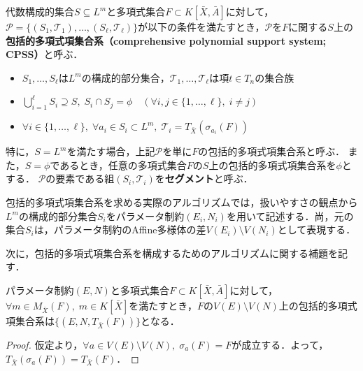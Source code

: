 \begin{definition}
	\label{chapter04:definition:CPSS}
	代数構成的集合$S \subseteq L^m$と多項式集合$F \subset K[\bar{X}, \bar{A}]$に対して，$\mathcal{P} = \{ (S_1, \mathscr{T}_1), \dots , (S_\ell, \mathscr{T}_\ell)  \}$が以下の条件を満たすとき，$\mathcal{P}$を$F$に関する$S$上の\textbf{包括的多項式項集合系（comprehensive polynomial support system; CPSS）}と呼ぶ．
	\begin{itemize}
		\item $S_1, \dots, S_\ell$は$L^m$の構成的部分集合，$\mathscr{T}_1, \dots, \mathscr{T}_\ell$は項$t \in T_n$の集合族
		\item $\displaystyle \bigcup_{i=1}^\ell S_i\supseteq S, \; S_i \cap S_j = \phi \quad (\forall i,j \in \{ 1, \dots, \ell \}, \; i \ne j)$
		\item $\forall i \in \{1, \dots, \ell \}, \; \forall a_i \in S_i \subset L^m, \; \mathscr{T}_i = T_{\bar{X}}(\sigma_{a_i}(F))$
	\end{itemize}
	特に，$S=L^m$を満たす場合，上記$\mathcal{P}$を単に$F$の包括的多項式項集合系と呼ぶ．
	また，$S=\phi$であるとき，任意の多項式集合$F$の$S$上の包括的多項式項集合系を$\phi$とする．
	$\mathcal{P}$の要素である組$(S_i, \mathscr{T}_i)$を\textbf{セグメント}と呼ぶ．
\end{definition}

\begin{remark*}
	包括的多項式項集合系を求める実際のアルゴリズムでは，扱いやすさの観点から$L^m$の構成的部分集合$S_i$をパラメータ制約$(E_i, N_i)$を用いて記述する．尚，元の集合$S_i$は，パラメータ制約のAffine多様体の差$V(E_i) \setminus V(N_i)$として表現する．
\end{remark*}

次に，包括的多項式項集合系を構成するためのアルゴリズムに関する補題を記す．

\begin{lemma}
	\label{chapter04:lemma:for_alg_1}
	パラメータ制約$(E, N)$と多項式集合$F \subset K[\bar{X}, \bar{A}]$に対して，$\forall m \in M_{\bar{X}}(F),\; m \in K[\bar{X}]$を満たすとき，$F$の$V(E) \setminus V(N)$上の包括的多項式項集合系は$\{(E, N, T_{\bar{X}}(F))\}$となる．
\end{lemma}

\begin{proof}
	仮定より，$\forall a \in V(E) \setminus V(N),\; \sigma_a(F) = F$が成立する．よって，$T_{\bar{X}}(\sigma_a(F)) = T_{\bar{X}}(F)$．
\end{proof}

